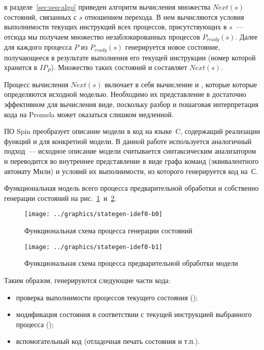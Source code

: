 в разделе~\ref{sec:seq-algo} приведен алгоритм вычисления множества $Next(s)$ состояний, связанных
с $s$ отношением перехода. В нем вычисляются условия выполнимости текущих инструкций всех
процессов, присутствующих в $s$~--- отсюда мы получаем множество незаблокированных
процессов $P_{ready}(s)$. Далее для каждого процесса $P$ из $P_{ready}(s)$ генерируется
новое состояние, получающееся в результате выполнения его текущей инструкции (номер
которой хранится в $IP_P$). Множество таких состояний и составляет $Next(s)$.

Процесс вычисления $Next(s)$ включает в себя вычисление  и ,
которые которые определяются исходной моделью. Необходимо их представление в достаточно
эффективном для вычисления виде, поскольку разбор и пошаговая интерпретация кода на
Promela может оказаться слишком медленной.

ПО Spin преобразует описание модели в код на языке~C, содержащий реализации функций
 и  для конкретной модели. В данной работе используется
аналогичный подход~--- исходное описание модели считывается синтаксическим анализатором и
переводится во внутреннее представление в виде графа команд (эквивалентного автомату Мили)
и условий их выполнимости, из которого генерируется код на~С.

Функциональная модель всего процесса предварительной обработки и собственно генерации
состояний на рис.~\ref{fig:stategen-idef0-b0}~и~\ref{fig:stategen-idef0-b1}.

\begin{figure}[ht]
  \centering
  \texttt{[image: ../graphics/stategen-idef0-b0]}
  \caption{Функциональная схема процесса генерации состояний}
\label{fig:stategen-idef0-b0}
\end{figure}

\begin{figure}[ht]
  \centering
  \texttt{[image: ../graphics/stategen-idef0-b1]}
  \caption{Функциональная схема процесса предварительной обработки модели}
\label{fig:stategen-idef0-b1}
\end{figure}

Таким образом, генерируются следующие части кода:

\begin{itemize}
\item проверка выполнимости процессов текущего состояния ();
\item модификация состояния в соответствии с текущей инструкцией выбранного процесса (); 
\item вспомогательный код (отладочная печать состояния и т.п.).
\end{itemize}

